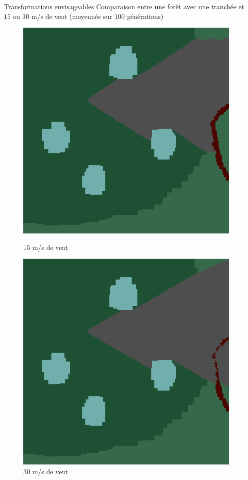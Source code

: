 \documentclass{beamer}
\begin{document}
\begin{frame}{Transformations envisageables \hyperlink{jump}{\beamerbutton{ }} \hypertarget{14}{\beamerbutton{ }}}
    Comparaison entre une forêt avec une tranchée et $15$ ou $30$ m/s de vent (moyennée sur $100$ générations)
    
    \begin{figure}[!htb]
        \begin{minipage}{0.48\textwidth}
          \centering
          \includegraphics[width=.8\linewidth]{pictures/trans/treach_15.png}
          \caption{$15$ m/s de vent}\label{Fig:Data1}
        \end{minipage}\hfill
        \begin{minipage}{0.48\textwidth}
          \centering
          \includegraphics[width=.8\linewidth]{pictures/trans/treach_30.png}
          \caption{$30$ m/s de vent}\label{Fig:Data2}
        \end{minipage}
     \end{figure}
\end{frame}
\end{document}
